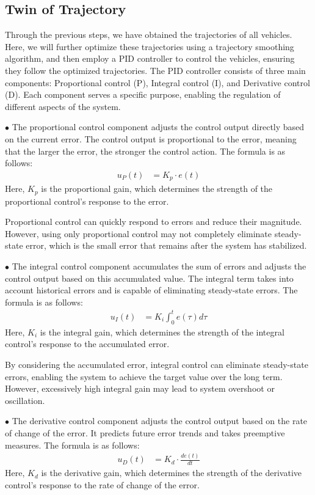 \subsection{Twin of Trajectory}

Through the previous steps, we have obtained the trajectories of all vehicles. 
Here, we will further optimize these trajectories using a trajectory smoothing algorithm, and then employ a PID controller to control the vehicles, ensuring they follow the optimized trajectories\cite{Alpher22d}. 
The PID controller consists of three main components: Proportional control (P), Integral control (I), and Derivative control (D). Each component serves a specific purpose, enabling the regulation of different aspects of the system.

$\bullet$ The proportional control component adjusts the control output directly based on the current error. 
The control output is proportional to the error, meaning that the larger the error, the stronger the control action. 
The formula is as follows:
\begin{align}
	u_{P}(t) & = K_{p} \cdot e(t)
\end{align}
Here, $K_{p}$ is the proportional gain, which determines the strength of the proportional control's response to the error.

Proportional control can quickly respond to errors and reduce their magnitude.
However, using only proportional control may not completely eliminate steady-state error, which is the small error that remains after the system has stabilized.

$\bullet$ The integral control component accumulates the sum of errors and adjusts the control output based on this accumulated value. 
The integral term takes into account historical errors and is capable of eliminating steady-state errors. 
The formula is as follows:
\begin{align}
	u_{I}(t) & = K_{i} \int_{0}^{t} e(\tau) d \tau
\end{align}
Here, $K_{i}$ is the integral gain, which determines the strength of the integral control's response to the accumulated error. 

By considering the accumulated error, integral control can eliminate steady-state errors, enabling the system to achieve the target value over the long term. 
However, excessively high integral gain may lead to system overshoot or oscillation.

$\bullet$ The derivative control component adjusts the control output based on the rate of change of the error. 
It predicts future error trends and takes preemptive measures. 
The formula is as follows:
\begin{align}
	u_{\mathit{D}}(t) & = K_{d} \cdot \frac{d e(t)}{d t}
\end{align}
Here, $K_{d}$ is the derivative gain, which determines the strength of the derivative control's response to the rate of change of the error.

